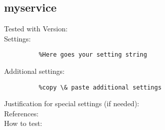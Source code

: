 \subsection{myservice}


\begin{description}
\item[Tested with Version:] 

\item[Settings:] \mbox{}

\begin{lstlisting}
    %Here goes your setting string
\end{lstlisting}

\item[Additional settings:] \mbox{}


\begin{lstlisting}
    %copy \& paste additional settings
\end{lstlisting}

\item[Justification for special settings (if needed):] \mbox{}


\item[References:] 


\item[How to test:]

\end{description}
